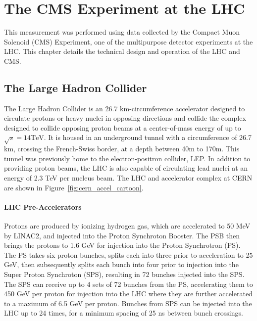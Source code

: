 \chapter{The CMS Experiment at the LHC}\label{ch:exp}
This measurement was performed using data collected by the Compact Muon Solenoid (CMS) Experiment, one of the multipurpose detector experiments at the LHC. This chapter details the technical design and operation of the LHC and CMS. 


\section{The Large Hadron Collider}
The Large Hadron Collider is an 26.7 km-circumference accelerator designed to circulate protons or heavy nuclei in opposing directions and collide the complex designed to collide opposing proton beams at a center-of-mass energy of up to $\sqrt{s}=14\mathrm{TeV}$. It is housed in an underground tunnel with a circumference of 26.7 km, crossing the French-Swiss border, at a depth between 40m to 170m. This tunnel was previously home to the electron-positron collider, LEP. In addition to providing proton beams, the LHC is also capable of circulating lead nuclei at an energy of 2.3 TeV per nucleus beam. The LHC and accelerator complex at CERN are shown in Figure~\ref{fig:cern_accel_cartoon}.


\subsubsection{LHC Pre-Accelerators}
Protons are produced by ionizing hydrogen gas, which are accelerated to 50 MeV by LINAC2, and injected into the Proton Synchroton Booster. The PSB then brings the protons to 1.6 GeV for injection into the Proton Synchrotron (PS). The PS takes six proton bunches, splits each into three prior to acceleration to 25 GeV, then subsequently splits each bunch into four prior to injection into the Super Proton Synchroton (SPS), resulting in 72 bunches injected into the SPS. The SPS can receive up to 4 sets of 72 bunches from the PS, accelerating them to 450 GeV per proton for injection into the LHC where they are further accelerated to a maximum of 6.5 GeV per proton. Bunches from SPS can be injected into the LHC up to 24 times, for a minimum spacing of 25 ns between bunch crossings\cite{Benedikt:2004wm}. 


